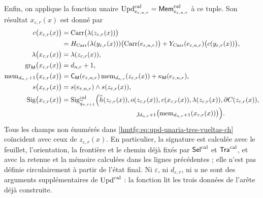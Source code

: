 Enfin, on applique la fonction unaire
\(\operatorname{Upd}^{\rm cal}_{e_{\varepsilon,n,r}}
=\mathsf{Mem}^{\rm cal}_{e_{\varepsilon,n,r}}\) à ce tuple. Son
résultat \(x_{\varepsilon,r}(x)\) est donné par
\begin{equation}
\begin{aligned}
 c\bigl(x_{\varepsilon,r}(x)\bigr)
   &=\operatorname{Carr}\bigl(\lambda(z_{\varepsilon,r}(x))\bigr)\\
   &=H_{\rm Carr}(\lambda(y_{\varepsilon,r}(x)))
       \bigl(\operatorname{Carr}(e_{\varepsilon,n,r})\bigr)
     +Y_{\rm Carr}(e_{\varepsilon,n,r})
       \bigl(c(y_{\varepsilon,r}(x))\bigr),\\
 \lambda\bigl(x_{\varepsilon,r}(x)\bigr)
   &=\lambda(z_{\varepsilon,r}(x)),\\
 \operatorname{gr}_{\mathsf M}
      \bigl(x_{\varepsilon,r}(x)\bigr)
   &=d_{n,r}+1,\\
 \operatorname{mem}_{d_{n,r}+1}
       \bigl(x_{\varepsilon,r}(x)\bigr)
   &=\mathsf C_{\mathsf M}(e_{\varepsilon,n,r})
       \operatorname{mem}_{d_{n,r}}(z_{\varepsilon,r}(x))
     +\kappa_{\mathsf M}(e_{\varepsilon,n,r}),\\
 s\bigl(x_{\varepsilon,r}(x)\bigr)
   &=s(e_{\varepsilon,n,r})\wedge s(z_{\varepsilon,r}(x)),\\
 \operatorname{Sig}\bigl(x_{\varepsilon,r}(x)\bigr)
   &=\operatorname{Sig}^{\rm cal}_{\widetilde q_{n,r+1}}
       \Bigl(\widehat h(z_{\varepsilon,r}(x)),
             o(z_{\varepsilon,r}(x)),
             c(x_{\varepsilon,r}(x)),
             \lambda(z_{\varepsilon,r}(x)),
             \partial C(z_{\varepsilon,r}(x)),\\[-2pt]
   &\hspace{112pt}
             \jmath_{d_{n,r}+1}
              \bigl(\operatorname{mem}_{d_{n,r}+1}
                 (x_{\varepsilon,r}(x))\bigr)\Bigr).
\end{aligned}
\label{hmtfg:eq:upd-unaria-tres-vueltas-ch}
\end{equation}
Tous les champs non énumérés dans \eqref{hmtfg:eq:upd-unaria-tres-vueltas-ch} coïncident avec ceux de \(z_{\varepsilon,r}(x)\). En particulier, la signature est calculée avec le feuillet, l'orientation, la frontière et le chemin déjà fixés par \(\mathsf{Sel}^{\rm cal}\) et \(\mathsf{Tra}^{\rm cal}\), et avec la retenue et la mémoire calculées dans les lignes précédentes ; elle n'est pas définie circulairement à partir de l'état final. Ni \(\varepsilon\), ni \(d_{\varepsilon,r}\), ni \(u\) ne sont des arguments supplémentaires de \(\operatorname{Upd}^{\rm cal}\) : la fonction lit les trois données de l'arête déjà construite.

